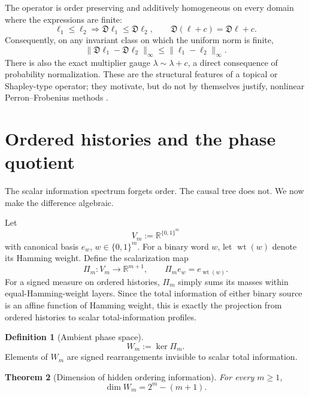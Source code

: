 \documentclass[11pt,a4paper]{article}
\newtheorem{theorem}{Theorem}[section]
\theoremstyle{definition}
\newtheorem{definition}[theorem]{Definition}
\theoremstyle{remark}
\newcommand{\R}{\mathbb R}
\newcommand{\cD}{\mathfrak D}
\newcommand{\bits}{\{0,1\}}
\newcommand{\wt}{\operatorname{wt}}
\begin{document}
The operator is order preserving and additively homogeneous on every domain
where the expressions are finite:
\[
 \ell_1\le\ell_2\Rightarrow\cD\ell_1\le\cD\ell_2,
 \qquad
 \cD(\ell+c)=\cD\ell+c.
\]
Consequently, on any invariant class on which the uniform norm is finite,
\[
 \|\cD\ell_1-\cD\ell_2\|_\infty
 \le\|\ell_1-\ell_2\|_\infty.
\]
There is also the exact multiplier gauge \(\lambda\sim\lambda+c\), a direct
consequence of probability normalization.  These are the structural features
of a topical or Shapley-type operator; they motivate, but do not by themselves
justify, nonlinear Perron--Frobenius methods
\cite{LemmensNussbaum2012,Lins2023,AkianGaubertHochart2020}.

\section{Ordered histories and the phase quotient}
\label{sec:phase}

The scalar information spectrum forgets order.  The causal tree does not.  We
now make the difference algebraic.

Let
\[
 V_m:=\R^{\bits^m}
\]
with canonical basis \(e_w\), \(w\in\bits^m\).  For a binary word \(w\), let
\(\wt(w)\) denote its Hamming weight.  Define the scalarization map
\begin{equation}
 \boxed{
 \Pi_m:V_m\to\R^{m+1},
 \qquad
 \Pi_m e_w=e_{\wt(w)}.
 }
 \label{eq:Pim}
\end{equation}
For a signed measure on ordered histories, \(\Pi_m\) simply sums its masses
within equal-Hamming-weight layers.  Since the total information of either
binary source is an affine function of Hamming weight, this is exactly the
projection from ordered histories to scalar total-information profiles.

\begin{definition}[Ambient phase space]
\begin{equation}
 \boxed{W_m:=\ker\Pi_m.}
 \label{eq:Wm}
\end{equation}
Elements of \(W_m\) are signed rearrangements invisible to scalar total
information.
\end{definition}

\begin{theorem}[Dimension of hidden ordering information]
\label{thm:phasedim}
For every \(m\ge1\),
\begin{equation}
 \boxed{\dim W_m=2^m-(m+1).}
 \label{eq:phasedim}
\end{equation}
\end{theorem}
\end{document}
